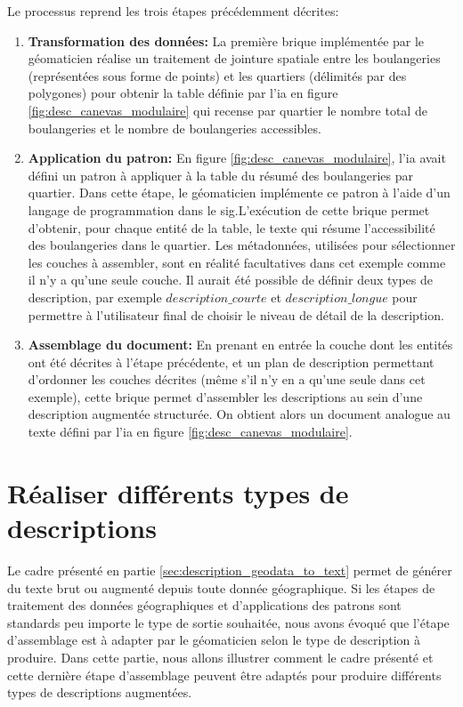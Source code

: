 Le processus reprend les trois étapes précédemment décrites:

\begin{enumerate}
    \item \textbf{Transformation des données:} La première brique implémentée par le géomaticien réalise un traitement de jointure spatiale entre les boulangeries (représentées sous forme de points) et les quartiers (délimités par des polygones) pour obtenir la table définie par l'\gls{ia} en figure \ref{fig:desc_canevas_modulaire} qui recense par quartier le nombre total de boulangeries et le nombre de boulangeries accessibles.
    \item \textbf{Application du patron:} En figure \ref{fig:desc_canevas_modulaire}, l'\gls{ia} avait défini un patron à appliquer à la table du résumé des boulangeries par quartier. Dans cette étape, le géomaticien implémente ce patron à l'aide d'un langage de programmation dans le \gls{sig}.L'exécution de cette brique permet d'obtenir, pour chaque entité de la table, le texte qui résume l'accessibilité des boulangeries dans le quartier. Les métadonnées, utilisées pour sélectionner les couches à assembler, sont en réalité facultatives dans cet exemple comme il n'y a qu'une seule couche. Il aurait été possible de définir deux types de description, par exemple $description\_courte$ et $description\_longue$ pour permettre à l'utilisateur final de choisir le niveau de détail de la description.
    \item \textbf{Assemblage du document:} En prenant en entrée la couche dont les entités ont été décrites à l'étape précédente, et un plan de description permettant d'ordonner les couches décrites (même s'il n'y en a qu'une seule dans cet exemple), cette brique permet d'assembler les descriptions au sein d'une description augmentée structurée. On obtient alors un document analogue au texte défini par l'\gls{ia} en figure \ref{fig:desc_canevas_modulaire}.
\end{enumerate}

\section{Réaliser différents types de descriptions}

\label{sec:description_cas_utilisation}

Le cadre présenté en partie \ref{sec:description_geodata_to_text} permet de générer du texte brut ou augmenté depuis toute donnée géographique. Si les étapes de traitement des données géographiques et d'applications des patrons sont standards peu importe le type de sortie souhaitée, nous avons évoqué que l'étape d'assemblage est à adapter par le géomaticien selon le type de description à produire. Dans cette partie, nous allons illustrer comment le cadre présenté et cette dernière étape d'assemblage peuvent être adaptés pour produire différents types de descriptions augmentées.

